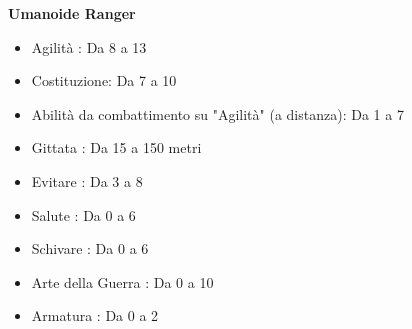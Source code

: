 \documentclass[../manuale_main.tex]{subfiles}
\begin{document}
\textbf{Umanoide Ranger}
\begin{itemize}
\item Agilità : Da 8 a 13
\item Costituzione: Da 7 a 10
\item Abilità da combattimento su "Agilità" (a distanza): Da 1 a 7
\item Gittata : Da 15 a 150 metri
\item Evitare : Da 3 a 8
\item Salute : Da 0 a 6
\item Schivare : Da 0 a 6
\item Arte della Guerra : Da 0 a 10
\item Armatura : Da 0 a 2
\end{itemize}
\end{document}
